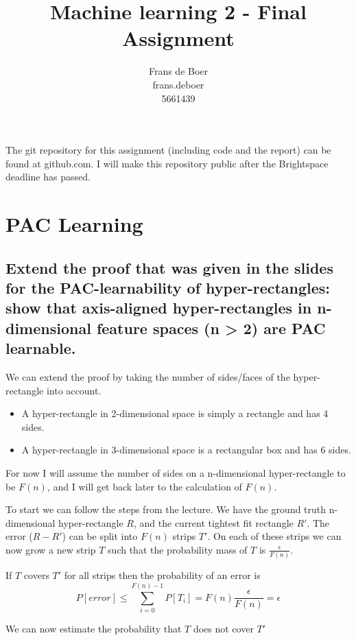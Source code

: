 \documentclass[11pt,a4paper]{article}
\title{Machine learning 2 - Final Assignment}
\author{
    Frans de Boer \\
    frans.deboer \\
    5661439 \\
}
\begin{document}
\maketitle

The git repository for this assignment (including code and the report) can be found at github.com. I will make this repository public after the Brightspace deadline has passed.

\section{PAC Learning}

\subsection{Extend the proof that was given in the slides for the PAC-learnability of hyper-rectangles:
show that axis-aligned hyper-rectangles in n-dimensional feature spaces (n > 2) are PAC
learnable.}
  
We can extend the proof by taking the number of sides/faces of the hyper-rectangle into account.
\begin{itemize}
    \item A hyper-rectangle in 2-dimensional space is simply a rectangle and has 4 sides.
    \item A hyper-rectangle in 3-dimensional space is a rectangular box and has 6 sides.
\end{itemize}
For now I will assume the number of sides on a n-dimensional hyper-rectangle to be $F(n)$, and I will get back later to the calculation of $F(n)$.

To start we can follow the steps from the lecture. We have the ground truth n-dimensional hyper-rectangle $R$, and the current tightest fit rectangle $R'$. The error ($R - R'$) can be split into $F(n)$ strips $T'$. On each of these strips we can now grow a new strip $T$ such that the probability mass of $T$ is $\frac{\epsilon}{F(n)}$.

If $T$ covers $T'$ for all strips then the probability of an error is
\begin{equation}
    \label{eq:total_error}
    P[error] \leq \sum_{i=0}^{F(n)-1}P[T_i] = F(n)\frac{\epsilon}{F(n)} = \epsilon
\end{equation}

We can now estimate the probability that $T$ does not cover $T'$
\end{document}
